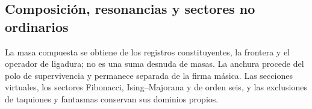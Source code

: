 \let\subsubsection\paragraph
\let\clearpage\relax

\endgroup
\begingroup
\let\chapter\section
\let\section\subsection
\let\subsection\subsubsection
\let\subsubsection\paragraph
\let\clearpage\relax

\endgroup

\section{Composición, resonancias y sectores no ordinarios}
La masa compuesta se obtiene de los registros constituyentes, la frontera y el
operador de ligadura; no es una suma desnuda de masas. La anchura procede del
polo de supervivencia y permanece separada de la firma másica. Las secciones
virtuales, los sectores Fibonacci, Ising--Majorana y de orden seis, y las
exclusiones de taquiones y fantasmas conservan sus dominios propios.

